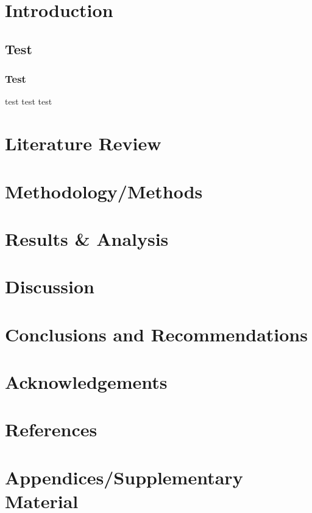 \thispagestyle{empty}
\newpage

\tableofcontents{\protect\thispagestyle{empty}}
\pagestyle{fancy}
\clearpage
\setcounter{page}{1}
\newpage



\section{Introduction}
\subsection{Test}
\subsubsection{Test}
test \textcite{dirac} test
test
\section{Literature Review}
\section{Methodology/Methods}
\section{Results \& Analysis}
\section{Discussion}
\section{Conclusions and Recommendations}
\section{Acknowledgements}
\section{References}
\printbibliography
\section{Appendices/Supplementary Material}



